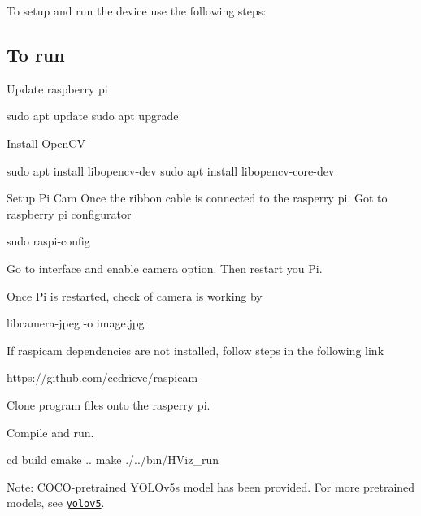 To setup and run the device use the following steps\+:

\subsection*{To run}


\begin{DoxyEnumerate}
\item Update raspberry pi 
\begin{DoxyCode}
sudo apt update
sudo apt upgrade
\end{DoxyCode}

\item Install Open\+CV 
\begin{DoxyCode}
sudo apt install libopencv-dev
sudo apt install libopencv-core-dev
\end{DoxyCode}

\item Setup Pi Cam Once the ribbon cable is connected to the rasperry pi. Got to raspberry pi configurator 
\begin{DoxyCode}
sudo raspi-config
\end{DoxyCode}

\item Go to interface and enable camera option. Then restart you Pi.
\item Once Pi is restarted, check of camera is working by 
\begin{DoxyCode}
libcamera-jpeg -o image.jpg
\end{DoxyCode}

\item If raspicam dependencies are not installed, follow steps in the following link 
\begin{DoxyCode}
https://github.com/cedricve/raspicam
\end{DoxyCode}

\item Clone program files onto the rasperry pi.
\item Compile and run. 
\begin{DoxyCode}
cd build
cmake ..
make
./../bin/HViz\_run
\end{DoxyCode}

\end{DoxyEnumerate}

Note\+: C\+O\+C\+O-\/pretrained Y\+O\+L\+Ov5s model has been provided. For more pretrained models, see \href{https://github.com/ultralytics/yolov5}{\tt yolov5}. 